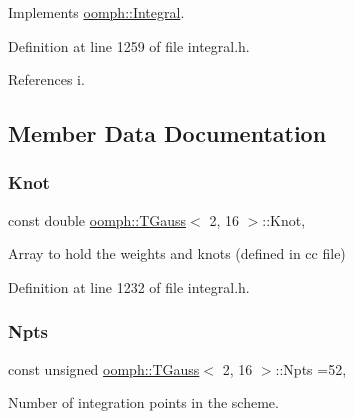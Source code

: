 Implements \hyperlink{classoomph_1_1Integral_ac65335e2aab120b285b3d6c294507b06}{oomph\+::\+Integral}.



Definition at line 1259 of file integral.\+h.



References i.



\subsection{Member Data Documentation}
\mbox{\label{classoomph_1_1TGauss_3_012_00_0116_01_4_a04e096e7446c033b71d6ec440f93f2c1}} 
\subsubsection{\texorpdfstring{Knot}{Knot}}
{\footnotesize\ttfamily const double \hyperlink{classoomph_1_1TGauss}{oomph\+::\+T\+Gauss}$<$ 2, 16 $>$\+::Knot\hspace{0.3cm}{\ttfamily [static]}, {\ttfamily [private]}}



Array to hold the weights and knots (defined in cc file) 



Definition at line 1232 of file integral.\+h.

\mbox{\label{classoomph_1_1TGauss_3_012_00_0116_01_4_a46633a677c921b569a7ac650ce2d69dd}} 
\subsubsection{\texorpdfstring{Npts}{Npts}}
{\footnotesize\ttfamily const unsigned \hyperlink{classoomph_1_1TGauss}{oomph\+::\+T\+Gauss}$<$ 2, 16 $>$\+::Npts =52\hspace{0.3cm}{\ttfamily [static]}, {\ttfamily [private]}}



Number of integration points in the scheme. 



